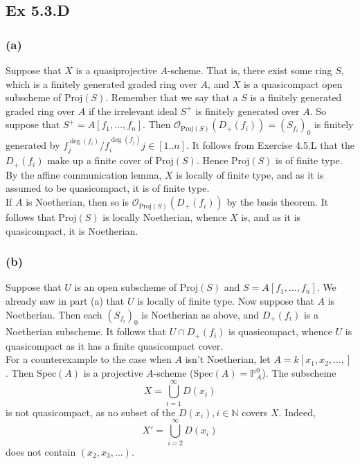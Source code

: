 \documentclass{article}
\theoremstyle{definition}
\renewcommand{\P}{\mathbb{P}}
\newcommand{\N}{\mathbb{N}}
\newcommand{\oo}{\mathcal{O}}
\newcommand{\Spec}{\text{Spec}}
\newcommand{\Proj}{\text{Proj}}
\begin{document}
\subsection*{Ex 5.3.D}

\subsubsection*{(a)}

Suppose that $X$ is a quasiprojective $A$-scheme. That is, there exist some
ring $S$, which is a finitely generated graded ring over $A$, and $X$ is a
quasicompact open subscheme of $\Proj(S)$. Remember that we say that a $S$ is a
finitely generated graded ring over $A$ if the irrelevant ideal $S^{+}$ is
finitely generated over $A$. So suppose that $S^{+} = A[f_1, \ldots, f_n]$.
Then $\oo_{\Proj(S)}(D_{+}(f_i)) = (S_{f_i})_0$ is finitely generated by
$f_j^{\deg(f_i)}/f_i^{\deg(f_j)} j \in [1..n]$. It follows from Exercise 4.5.L
that the $D_{+}(f_i)$ make up a finite cover of $\Proj(S)$. Hence $\Proj(S)$ is
of finite type. By the affine communication lemma, $X$ is locally of finite
type, and as it is assumed to be quasicompact, it is of finite type. \\

If $A$ is Noetherian, then so is $\oo_{\Proj(S)}(D_{+}(f_i))$ by the basis
theorem. It follows that $\Proj(S)$ is locally Noetherian, whence $X$ is, and
as it is quasicompact, it is Noetherian.

\subsubsection*{(b)}

Suppose that $U$ is an open subscheme of $\Proj(S)$ and $S = A[f_1, \ldots,
f_n]$. We already saw in part (a) that $U$ is locally of finite type. Now
suppose that $A$ is Noetherian. Then each $(S_{f_i})_0$ is Noetherian as above,
and $D_{+}(f_i)$ is a Noetherian subscheme. It follows that $U \cap D_{+}(f_i)$
is quasicompact, whence $U$ is quasicompact as it has a finite quasicompact
cover. \\

For a counterexample to the case when $A$ isn't Noetherian, let $A = k[x_1,
x_2, \ldots, ]$. Then $\Spec(A)$ is a projective $A$-scheme ($\Spec(A) =
\P^{0}_{A}$). The subscheme 
\[
	X = \bigcup_{i = 1}^{\infty}D(x_i)
\] 
is not quasicompact, as no subset of the $D(x_i), i \in \N$ covers $X$. Indeed,
\[
	X' = \bigcup_{i = 2}^{\infty}D(x_i)
\] 
does not contain $(x_2, x_3, \ldots)$.
\end{document}
